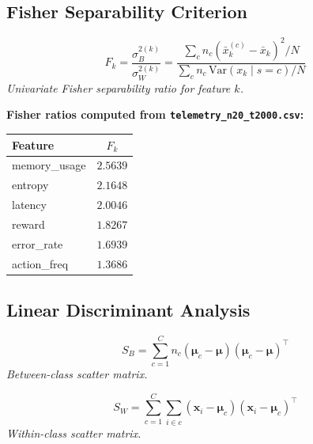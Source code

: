 \documentclass[12pt]{article}
\begin{document}
\subsection{Fisher Separability Criterion}

\begin{equation}
F_k = \frac{\sigma^{2(k)}_B}{\sigma^{2(k)}_W} = \frac{\sum_c n_c(\bar{x}_k^{(c)} - \bar{x}_k)^2 / N}{\sum_c n_c \,\mathrm{Var}(x_k \mid s=c) / N}
\end{equation}
\noindent\textit{Univariate Fisher separability ratio for feature $k$.}


\noindent\textbf{Fisher ratios computed from \texttt{telemetry\_n20\_t2000.csv}:}
\begin{center}\begin{tabular}{lc}\toprule
Feature & $F_k$ \\ \midrule

memory\_usage & $2.5639$ \\

entropy & $2.1648$ \\

latency & $2.0046$ \\

reward & $1.8267$ \\

error\_rate & $1.6939$ \\

action\_freq & $1.3686$ \\

\bottomrule\end{tabular}\end{center}



\subsection{Linear Discriminant Analysis}

\begin{equation}
S_B = \sum_{c=1}^{C} n_c (\boldsymbol{\mu}_c - \boldsymbol{\mu})(\boldsymbol{\mu}_c - \boldsymbol{\mu})^\top
\end{equation}
\noindent\textit{Between-class scatter matrix.}


\begin{equation}
S_W = \sum_{c=1}^{C}\sum_{i \in c}(\mathbf{x}_i - \boldsymbol{\mu}_c)(\mathbf{x}_i - \boldsymbol{\mu}_c)^\top
\end{equation}
\noindent\textit{Within-class scatter matrix.}
\end{document}
